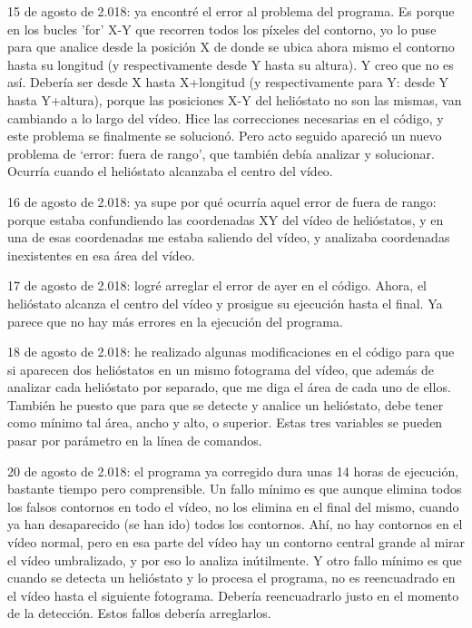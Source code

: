 15 de agosto de 2.018: ya encontré el error al problema del programa. Es porque en los bucles 'for' X-Y que recorren todos los píxeles del contorno, yo lo puse para que analice desde la posición X de donde se ubica ahora mismo el contorno hasta su longitud (y respectivamente desde Y hasta su altura). Y creo que no es así. Debería ser desde X hasta X+longitud (y respectivamente para Y: desde Y hasta Y+altura), porque las posiciones X-Y del helióstato no son las mismas, van cambiando a lo largo del vídeo. Hice las correcciones necesarias en el código, y este problema se finalmente se solucionó. Pero acto seguido apareció un nuevo problema de ‘error: fuera de rango’, que también debía analizar y solucionar. Ocurría cuando el helióstato alcanzaba el centro del vídeo.

16 de agosto de 2.018: ya supe por qué ocurría aquel error de fuera de rango: porque estaba confundiendo las coordenadas XY del vídeo de helióstatos, y en una de esas coordenadas me estaba saliendo del vídeo, y analizaba coordenadas inexistentes en esa área del vídeo.

17 de agosto de 2.018: logré arreglar el error de ayer en el código. Ahora, el helióstato alcanza el centro del vídeo y prosigue su ejecución hasta el final. Ya parece que no hay más errores en la ejecución del programa.

18 de agosto de 2.018: he realizado algunas modificaciones en el código para que si aparecen dos helióstatos en un mismo fotograma del vídeo, que además de analizar cada helióstato por separado, que me diga el área de cada uno de ellos. También he puesto que para que se detecte y analice un helióstato, debe tener como mínimo tal área, ancho y alto, o superior. Estas tres variables se pueden pasar por parámetro en la línea de comandos.

20 de agosto de 2.018: el programa ya corregido dura unas 14 horas de ejecución, bastante tiempo pero comprensible. Un fallo mínimo es que aunque elimina todos los falsos contornos en todo el vídeo, no los elimina en el final del mismo, cuando ya han desaparecido (se han ido) todos los contornos. Ahí, no hay contornos en el vídeo normal, pero en esa parte del vídeo hay un contorno central grande al mirar el vídeo umbralizado, y por eso lo analiza inútilmente. Y otro fallo mínimo es que cuando se detecta un helióstato y lo procesa el programa, no es reencuadrado en el vídeo hasta el siguiente fotograma. Debería reencuadrarlo justo en el momento de la detección. Estos fallos debería arreglarlos.


